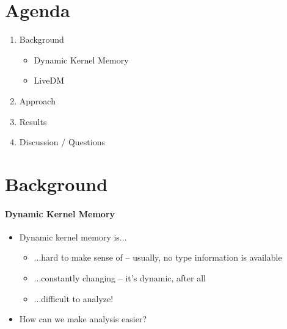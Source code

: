 \documentclass{i20lecture}
\subtitle{LiveDM --- Proof of Concept}
\begin{document}
\frame{\titlepage}

\section{Agenda}
\begin{frame}{\insertsection}
  \begin{enumerate}
   \item Background
    \begin{itemize}
        \item Dynamic Kernel Memory
        \item LiveDM
    \end{itemize}
    \item Approach
    \item Results
    \item Discussion / Questions
  \end{enumerate}
\end{frame}

\section{Background}
\begin{frame}{\insertsection}
  \framesubtitle{Dynamic Kernel Memory}

  \begin{itemize}
    \item Dynamic kernel memory is...
    \begin{itemize}
\pause
    \item ...hard to make sense of -- usually, no type information is available
\pause
	\item ...constantly changing -- it's dynamic, after all
\pause
    \item ...difficult to analyze!
    \end{itemize}
\pause
    \item How can we make analysis easier?
  \end{itemize}
\end{frame}
\end{document}
